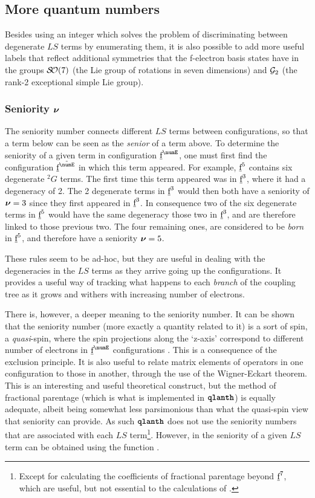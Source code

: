 \documentclass[11pt, twoside,openright]{article}
\begin{document}
\subsection{More quantum numbers}

Besides using an integer which solves the problem of discriminating between degenerate $LS$ terms by enumerating them, it is also possible to add more useful labels that reflect additional symmetries that the f-electron basis states have in the groups $\mathcal{S\!O}(7)$ (the Lie group of rotations in seven dimensions) and $\mathcal{G}_2$ (the rank-2 exceptional simple Lie group).

\subsubsection{Seniority $\boldsymbol{\nu}$}

The seniority number connects different $LS$ terms between configurations, so that a term below can be seen as the \textit{senior} of a term above. To determine the seniority of a given term in configuration $\forb^\numE$, one must first find the configuration $\forb^{\tilde{\numE}}$ in which this term appeared. For example, $\underbar{\text{f}}^{5}$ contains six degenerate ${}^2G$ terms. The first time this term appeared was in $\underbar{\text{f}}^3$, where it had a degeneracy of 2. The 2 degenerate terms in $\underbar{\text{f}}^3$ would then both have a seniority of $\boldsymbol{\nu}=3$ since they first appeared in $\underbar{\text{f}}^3$. In consequence two of the six degenerate terms in $\underbar{\text{f}}^5$ would have the same degeneracy those two in $\underbar{\text{f}}^3$, and are therefore linked to those previous two. The four remaining ones, are  considered to be \textit{born} in $\underbar{\text{f}}^5$, and therefore have a seniority $\boldsymbol{\nu}=5$.

These rules seem to be ad-hoc, but they are useful in dealing with the degeneracies in the $LS$ terms as they arrive going up the configurations. It provides a useful way of tracking what happens to each \textit{branch} of the coupling tree as it grows and withers with increasing number of electrons.

There is, however, a deeper meaning to the seniority number. It can be shown that the seniority number (more exactly a quantity related to it) is a sort of spin, a \textit{quasi}-spin, where the spin projections along the `z-axis' correspond to different number of electrons in $\forb^\numE$ configurations \cite{judd_second_1967}. This is a consequence of the exclusion principle. It is also useful to relate matrix elements of operators in one configuration to those in another, through the use of the Wigner-Eckart theorem. This is an interesting and useful theoretical construct, but the method of fractional parentage (which is what is implemented in $\textbf{\texttt{qlanth}}$) is equally adequate, albeit being somewhat less parsimonious than what the quasi-spin view that seniority can provide. As such $\textbf{\texttt{qlanth}}$ does not use the seniority numbers that are associated with each $LS$ term\footnote{Except for calculating the coefficients of fractional parentage beyond $\underbar{\text{f}}^7$, which are useful, but not essential to the calculations of \qlanth.}. However, in \qlanth the seniority of a given $LS$ term can be obtained using the function .
\end{document}
